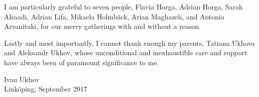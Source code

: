 I am particularly grateful to seven people, Flavia Horga, Adrian Horga, Sarah
Alsaadi, Adrian Lifa, Mikaela Holmbäck, Arian Maghazeh, and Antonia Arvanitaki,
for our merry gatherings with and without a reason.

Lastly and most importantly, I cannot thank enough my parents, Tatiana Ukhova
and Aleksandr Ukhov, whose unconditional and inexhaustible care and support have
always been of paramount significance to me.

\vspace{4em}
\hfill
\begin{minipage}{0.36\textwidth}
Ivan Ukhov\\
Linköping, September 2017
\end{minipage}
